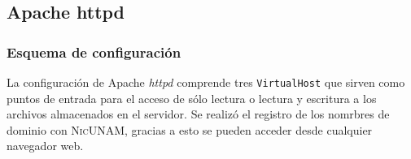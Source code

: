       \subsection {Apache httpd}

        \subsubsection {Esquema de configuraci\'{o}n}

La configuraci\'{o}n de Apache \textit{httpd} comprende tres \texttt{VirtualHost} que sirven como puntos de entrada para el acceso de s\'{o}lo lectura o lectura y escritura a los archivos almacenados en el servidor. Se realiz\'{o} el registro de los nomrbres de dominio con \textsc{NicUNAM}, gracias a esto se pueden acceder desde cualquier navegador web.

{
\begin{table}[H]
\caption{VirtualHost configurados en Apache HTTPD}{}
\label{tab:virtualhost}
\noindent{} %
\end{table}
}


